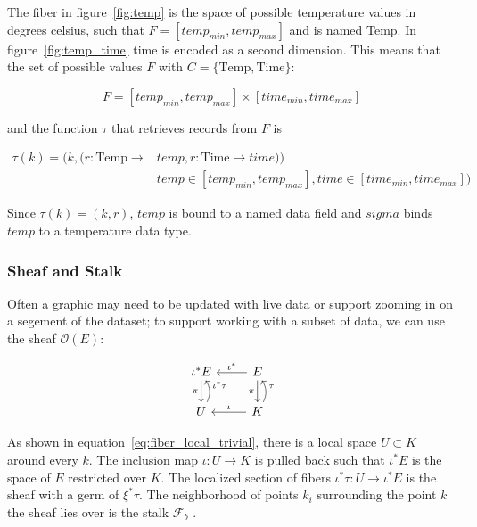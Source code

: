 \documentclass[../main.tex]{subfiles}
\begin{document}
The fiber in figure~\ref{fig:temp} is the space of possible temperature values in degrees celsius, such that $F=[temp_{min}, temp_{max}]$ and is named \textrm{Temp}. In figure~\ref{fig:temp_time} \textrm{time} is encoded as a second dimension. This means that the set of possible values $F$ with $C=\{\textrm{Temp}, \textrm{Time}\}$:

\begin{equation}
F = [temp_{min}, temp_{max}] \times [time_{min}, time_{max}]
\end{equation}

and the function $\tau$ that retrieves records from $F$ is

\begin{align}
\tau(k) =(k, (r: \textrm{Temp}\rightarrow &temp, r: \textrm{Time}\rightarrow time))\\
&temp \in [temp_{min}, temp_{max}], time \in [time_{min}, time_{max}])
\end{align}

Since $\tau(k)=(k, r)$, $temp$ is bound to a named data field and $sigma$ binds $temp$ to a temperature data type. 

\subsubsection{Sheaf and Stalk}

Often a graphic may need to be updated with live data or support zooming in on a segement of the dataset; to support working with a subset of data, we can use the sheaf $\mathcal{O}(E)$: 

\begin{equation}
    \label{eq:sheaf}
    \begin{tikzcd}
        \iota^*E \arrow[d, "\pi"']           & E \arrow[d, "\pi"'] \arrow[l, "\iota^*"']         \\
        U \arrow[u, "\iota^*\tau"', bend right] & K \arrow[u, "\tau"', bend right] \arrow[l, "\iota"']
        \end{tikzcd}
\end{equation}

As shown in equation~\ref{eq:fiber_local_trivial}, there is a local space $U \subset K$ around every $k$. The inclusion map $\iota: U \rightarrow K$ is pulled back such that $\iota^{*}E$ is the space of $E$ restricted over $K$. The localized section of fibers $\iota^*\tau: U \rightarrow \iota^*E$ is the sheaf with a germ of $\xi^*\tau$. The neighborhood of points $k_i$ surrounding the point $k$ the sheaf lies over is the stalk $\mathcal{F}_b$ \cite{StalkSheaf2019,spanier1989algebraic}.
\end{document}
